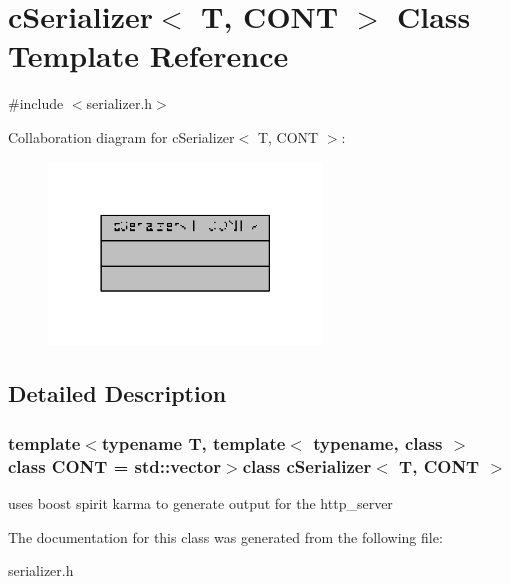\hypertarget{classcSerializer}{\section{c\-Serializer$<$ T, C\-O\-N\-T $>$ Class Template Reference}
\label{classcSerializer}
}


{\ttfamily \#include $<$serializer.\-h$>$}



Collaboration diagram for c\-Serializer$<$ T, C\-O\-N\-T $>$\-:
\nopagebreak
\begin{figure}[H]
\begin{center}
\leavevmode
\includegraphics[width=206pt]{classcSerializer__coll__graph}
\end{center}
\end{figure}


\subsection{Detailed Description}
\subsubsection*{template$<$typename T, template$<$ typename, class $>$ class C\-O\-N\-T = std\-::vector$>$class c\-Serializer$<$ T, C\-O\-N\-T $>$}

uses boost spirit karma to generate output for the http\-\_\-server 

The documentation for this class was generated from the following file\-:\begin{DoxyCompactItemize}
\item 
serializer.\-h\end{DoxyCompactItemize}

